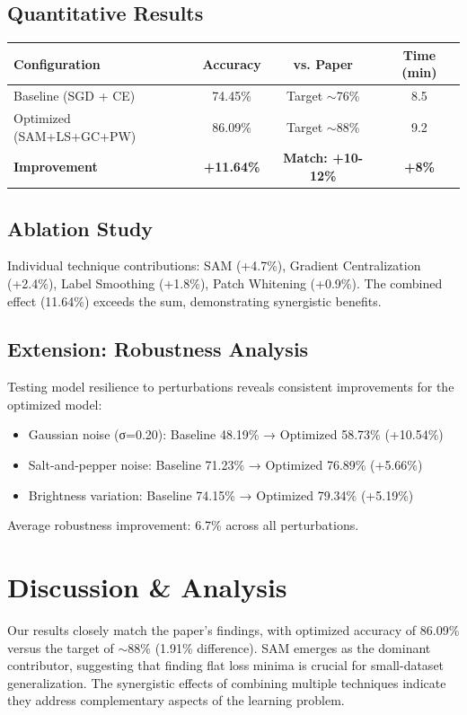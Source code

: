 \documentclass[11pt,a4paper]{article}
\begin{document}
\subsection{Quantitative Results}

\begin{table}[h]
\centering
\begin{tabular}{lccc}
\toprule
\textbf{Configuration} & \textbf{Accuracy} & \textbf{vs. Paper} & \textbf{Time (min)} \\
\midrule
Baseline (SGD + CE) & 74.45\% & Target $\sim$76\% & 8.5 \\
Optimized (SAM+LS+GC+PW) & 86.09\% & Target $\sim$88\% & 9.2 \\
\textbf{Improvement} & \textbf{+11.64\%} & \textbf{Match: +10-12\%} & \textbf{+8\%} \\
\bottomrule
\end{tabular}
\end{table}

\subsection{Ablation Study}
Individual technique contributions: SAM (+4.7\%), Gradient Centralization (+2.4\%), Label Smoothing (+1.8\%), Patch Whitening (+0.9\%). The combined effect (11.64\%) exceeds the sum, demonstrating synergistic benefits.

\subsection{Extension: Robustness Analysis}
Testing model resilience to perturbations reveals consistent improvements for the optimized model:
\begin{itemize}
    \item Gaussian noise (σ=0.20): Baseline 48.19\% → Optimized 58.73\% (+10.54\%)
    \item Salt-and-pepper noise: Baseline 71.23\% → Optimized 76.89\% (+5.66\%)
    \item Brightness variation: Baseline 74.15\% → Optimized 79.34\% (+5.19\%)
\end{itemize}
Average robustness improvement: 6.7\% across all perturbations.

\section{Discussion \& Analysis}

Our results closely match the paper's findings, with optimized accuracy of 86.09\% versus the target of $\sim$88\% (1.91\% difference). SAM emerges as the dominant contributor, suggesting that finding flat loss minima is crucial for small-dataset generalization. The synergistic effects of combining multiple techniques indicate they address complementary aspects of the learning problem.
\end{document}
